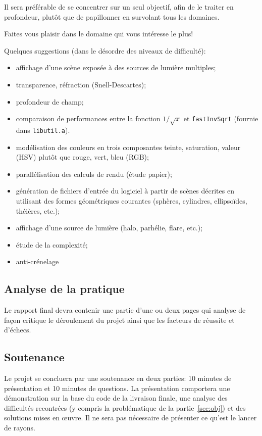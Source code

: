 \documentclass[10pt, a4paper ]{article}
\begin{document}
Il sera préférable de se concentrer sur un seul objectif, afin de le traiter en
profondeur, plutôt que de papillonner en survolant tous les domaines.

Faites vous plaisir dans le domaine qui vous intéresse le plus!

Quelques suggestions (dans le désordre des niveaux de difficulté):
\begin{itemize}
    \item affichage d'une scène exposée à des sources de lumière multiples;
    \item transparence, réfraction (Snell-Descartes);
    \item profondeur de champ;
    \item comparaison de performances entre la fonction $1/\sqrt{x}$ et
        \texttt{fastInvSqrt} (fournie dans \texttt{libutil.a}).
    \item modélisation des couleurs en trois composantes
        teinte, saturation, valeur (HSV) plutôt que rouge, vert, bleu (RGB);
    \item parallélisation des calculs de rendu (étude papier);
    \item génération de fichiers d'entrée du logiciel à partir de scènes
        décrites en utilisant des formes géométriques courantes (sphères,
        cylindres, ellipsoïdes, théières, etc.);
    \item affichage d'une source de lumière (halo, parhélie, flare,  etc.);
    \item étude de la complexité;
    \item anti-crénelage
\end{itemize}

\subsection{Analyse de la pratique }

Le rapport final devra contenir une partie d'une ou deux pages qui analyse de
façon critique le déroulement du projet ainsi que les facteurs de réussite et
d'échecs.

\subsection{Soutenance }

Le projet se concluera par une soutenance en deux parties: 10 minutes de
présentation et 10 minutes de questions. La présentation comportera une
démonstration sur la base du code de la livraison finale, une analyse des
difficultés recontrées (y compris la problématique de la partie~\ref{sec:obj})
et des solutions mises en œuvre. Il ne sera pas nécessaire de présenter ce
qu'est le lancer de rayons.
\end{document}
